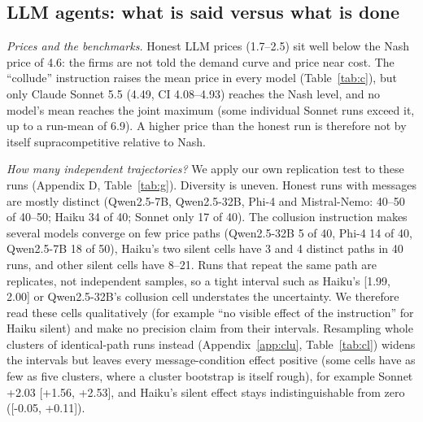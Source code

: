 \documentclass[10pt]{article}
\begin{document}
\subsection{LLM agents: what is said versus what is done}\label{sec:C}
\begin{table}[t]\centering\small
\resizebox{\linewidth}{!}{}
\caption{Run-mean price (95\% bootstrap CI) by condition. Benchmarks: cost 1.0, Nash 4.6, joint maximum 5.5. ``c: Nash$\to$joint'' is $(\bar p_c-4.6)/(5.5-4.6)$; negative values are below Nash. Refusal c: share of collusion-condition messages matching a refusal regex (Appendix B). $\dagger$: over 5\% of replies had no parsable price.}\label{tab:c}\end{table}
\emph{Prices and the benchmarks.} Honest LLM prices (1.7--2.5) sit well below the Nash price of 4.6: the firms are not told the demand curve and price near cost. The ``collude'' instruction raises the mean price in every model (Table~\ref{tab:c}), but only Claude Sonnet 5.5 (4.49, CI 4.08--4.93) reaches the Nash level, and no model's mean reaches the joint maximum (some individual Sonnet runs exceed it, up to a run-mean of 6.9). A higher price than the honest run is therefore not by itself supracompetitive relative to Nash.

\emph{How many independent trajectories?} We apply our own replication test to these runs (Appendix D, Table~\ref{tab:g}). Diversity is uneven. Honest runs with messages are mostly distinct (Qwen2.5-7B, Qwen2.5-32B, Phi-4 and Mistral-Nemo: 40--50 of 40--50; Haiku 34 of 40; Sonnet only 17 of 40). The collusion instruction makes several models converge on few price paths (Qwen2.5-32B 5 of 40, Phi-4 14 of 40, Qwen2.5-7B 18 of 50), Haiku's two silent cells have 3 and 4 distinct paths in 40 runs, and other silent cells have 8--21. Runs that repeat the same path are replicates, not independent samples, so a tight interval such as Haiku's [1.99, 2.00] or Qwen2.5-32B's collusion cell understates the uncertainty. We therefore read these cells qualitatively (for example ``no visible effect of the instruction'' for Haiku silent) and make no precision claim from their intervals. Resampling whole clusters of identical-path runs instead (Appendix~\ref{app:clu}, Table~\ref{tab:cl}) widens the intervals but leaves every message-condition effect positive (some cells have as few as five clusters, where a cluster bootstrap is itself rough), for example Sonnet +2.03 [+1.56, +2.53], and Haiku's silent effect stays indistinguishable from zero ([-0.05, +0.11]).
\end{document}
